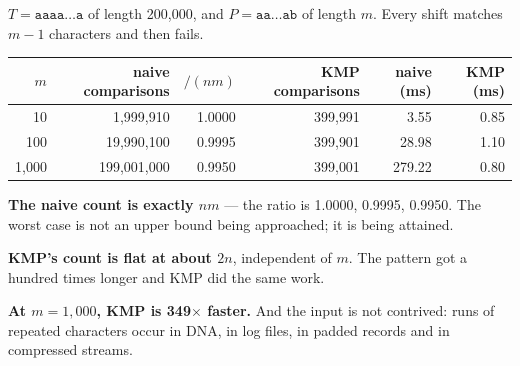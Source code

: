 \begin{worked}
$T = \texttt{aaaa}\ldots\texttt{a}$ of length 200{,}000, and
$P = \texttt{aa}\ldots\texttt{ab}$ of length $m$. Every shift matches $m-1$
characters and then fails.

\begin{center}
\begin{tabular}{@{}rrrrrr@{}}
\toprule
\rowcolor{primary!15}
$m$ & naive comparisons & $/(nm)$ & KMP comparisons & naive (ms) & KMP (ms) \\
\midrule
   10 &     1{,}999{,}910 & 1.0000 & 399{,}991 &   3.55 & 0.85 \\
  100 &    19{,}990{,}100 & 0.9995 & 399{,}901 &  28.98 & 1.10 \\
1{,}000 &   199{,}001{,}000 & 0.9950 & 399{,}001 & 279.22 & 0.80 \\
\bottomrule
\end{tabular}
\end{center}

\smallskip
\textbf{The naive count is exactly $nm$} --- the ratio is 1.0000, 0.9995,
0.9950. The worst case is not an upper bound being approached; it is being
attained.

\smallskip
\textbf{KMP's count is flat at about $2n$}, independent of $m$. The pattern got
a hundred times longer and KMP did the same work.

\smallskip
\textbf{At $m = 1{,}000$, KMP is 349$\times$ faster.} And the input is not
contrived: runs of repeated characters occur in DNA, in log files, in padded
records and in compressed streams.
\end{worked}


